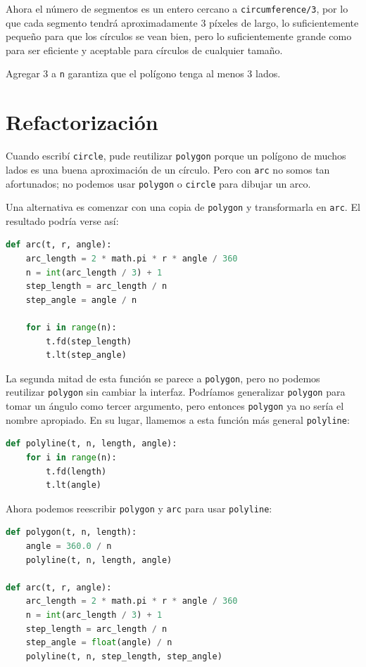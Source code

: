 Ahora el número de segmentos es un entero cercano a \texttt{circumference/3}, por lo que cada segmento tendrá aproximadamente 3 píxeles de largo, lo suficientemente pequeño para que los círculos se vean bien, pero lo suficientemente grande como para ser eficiente y aceptable para círculos de cualquier tamaño.

Agregar 3 a \texttt{n} garantiza que el polígono tenga al menos 3 lados.

\section{Refactorización}

Cuando escribí \texttt{circle}, pude reutilizar \texttt{polygon} porque un polígono de muchos lados es una buena aproximación de un círculo. Pero con \texttt{arc} no somos tan afortunados; no podemos usar \texttt{polygon} o \texttt{circle} para dibujar un arco.


Una alternativa es comenzar con una copia de \texttt{polygon} y transformarla en \texttt{arc}. El resultado podría verse así:

\begin{lstlisting}[language=Python]
def arc(t, r, angle):
    arc_length = 2 * math.pi * r * angle / 360
    n = int(arc_length / 3) + 1
    step_length = arc_length / n
    step_angle = angle / n
    
    for i in range(n):
        t.fd(step_length)
        t.lt(step_angle)
\end{lstlisting}

La segunda mitad de esta función se parece a \texttt{polygon}, pero no podemos reutilizar \texttt{polygon} sin cambiar la interfaz. Podríamos generalizar \texttt{polygon} para tomar un ángulo como tercer argumento, pero entonces \texttt{polygon} ya no sería el nombre apropiado. En su lugar, llamemos a esta función más general \texttt{polyline}:

\begin{lstlisting}[language=Python]
def polyline(t, n, length, angle):
    for i in range(n):
        t.fd(length)
        t.lt(angle)
\end{lstlisting}

Ahora podemos reescribir \texttt{polygon} y \texttt{arc} para usar \texttt{polyline}:

\begin{lstlisting}[language=Python]
def polygon(t, n, length):
    angle = 360.0 / n
    polyline(t, n, length, angle)

def arc(t, r, angle):
    arc_length = 2 * math.pi * r * angle / 360
    n = int(arc_length / 3) + 1
    step_length = arc_length / n
    step_angle = float(angle) / n
    polyline(t, n, step_length, step_angle)
\end{lstlisting}

